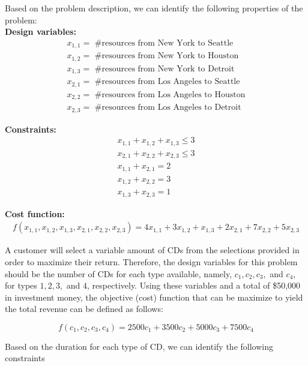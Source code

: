 \documentclass[11pt]{article}
\begin{document}
\begin{prob}{2}
\end{prob}
\begin{sol} 

Based on the problem description, we can identify the following properties of the problem: \\

\textbf{Design variables:}\\ 
\begin{eqnarray*}
x_{1,1} = \text{ \#resources from New York to Seattle}\\
x_{1,2} = \text{ \#resources from New York to Houston} \\
x_{1,3} = \text{ \#resources from New York to Detroit} \\
x_{2,1} = \text{ \#resources from Los Angeles to Seattle} \\
x_{2,2} = \text{ \#resources from Los Angeles to Houston} \\
x_{2,3} = \text{ \#resources from Los Angeles to Detroit}
\end{eqnarray*}

\textbf{Constraints:} \\
\begin{eqnarray*}
x_{1,1} + x_{1,2} + x_{1,3} \leq 3 \\
x_{2,1} + x_{2,2} + x_{2,3} \leq 3 \\
x_{1,1} + x_{2,1} = 2 \\
x_{1,2} + x_{2,2} = 3 \\
x_{1,3} + x_{2,3} = 1 
\end{eqnarray*}

\textbf{Cost function:}
\begin{eqnarray*}
f(x_{1,1},x_{1,2},x_{1,3},x_{2,1},x_{2,2},x_{2,3}) = 4x_{1,1} + 3x_{1,2} + x_{1,3} + 2x_{2,1} + 7x_{2,2} + 5x_{2,3}
\end{eqnarray*}

\end{sol}

\begin{prob}{3}
\end{prob}
\begin{sol} 
A customer will select a variable amount of CDs from the selections provided in order to maximize their return. Therefore, the design variables for this problem should be the number of CDs for each type available, namely, $c_{1}, c_{2}, c_{3},$ and $c_{4}$, for types $1, 2, 3,$ and $4$, respectively. Using these variables and a total of \$50,000 in investment money, the objective (cost) function that can be maximize to yield the total revenue can be defined as follows:

\begin{equation*}
f(c_{1}, c_{2}, c_{3}, c_{4}) = 2500c_{1} + 3500c_{2} + 5000c_{3} + 7500c_{4}
\end{equation*}

Based on the duration for each type of CD, we can identify the following constraints 

\end{sol}
\end{document}
